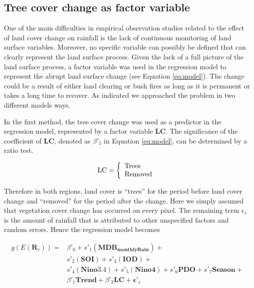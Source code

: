\documentclass[fleqn,10pt,lineno]{wlpeerj} %
\theoremstyle{definition}
\theoremstyle{definition}
\theoremstyle{definition}
\theoremstyle{remark}
\begin{document}
\subsection{Tree cover change as factor variable}

One of the main difficulties in empirical observation studies related to
the effect of land cover change on rainfall is the lack of continuous
monitoring of land surface variables. Moreover, no specific variable can
possibly be defined that can clearly represent the land surface process.
Given the lack of a full picture of the land surface process, a factor
variable was used in the regression model to represent the abrupt land
surface change (see Equation \eqref{eq:model}). The change could be a
result of either land clearing or bush fires as long as it is permanent
or takes a long time to recover. As indicated we approached the problem
in two different models ways.

In the first method, the tree cover change was used as a predictor in
the regression model, represented by a factor variable \textbf{LC}. The
significance of the coefficient of \textbf{LC}, denoted as \(\beta'_5\)
in Equation \eqref{eq:model}, can be determined by a ratio test.

\begin{equation}
  \mbox{LC} = \left\{
  \begin{array}{ll}
     \mbox{Trees} \\
     \mbox{Removed}
  \end{array} \right.\\
\label{eq:dummyC}
\end{equation}

Therefore in both regions, land cover is ``trees'' for the period before
land cover change and ``removed'' for the period after the change. Here
we simply assumed that vegetation cover change has occurred on every
pixel. The remaining term \(\epsilon_r\) is the amount of rainfall that
is attributed to other unspecified factors and random errors. Hence the
regression model becomes \vspace{0.5cm}

\begin{equation}
\begin{array}{lll}
g(E(\mathbf{R}_r)) = &\beta'_0 + s'_1(\mathbf{MDB_{monthlyRain}}) + \\
  &s'_2(\mathbf{SOI}) + s'_3(\mathbf{IOD}) + \\
  &s'_4(\mathbf{Nino3.4}) + s'_5(\mathbf{Nino4}) + s'_6\mathbf{PDO} + s'_7\mathbf{Season} + \\
  &\beta'_1\mathbf{Trend} + \beta'_2\mathbf{LC} + \boldsymbol{\epsilon'}_r
\end{array}
\label{eq:model2}
\end{equation}
\end{document}
